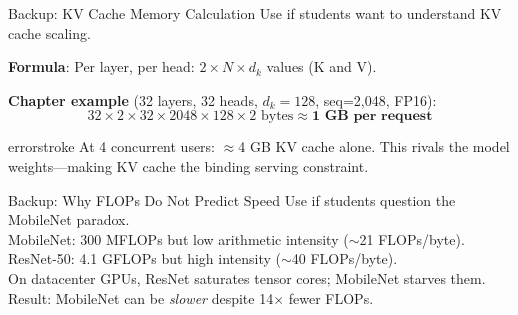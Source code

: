 \documentclass[aspectratio=169, 12pt]{beamer}
\begin{document}
\appendix

\begin{frame}{Backup: KV Cache Memory Calculation}
\small
Use if students want to understand KV cache scaling.

\vspace{0.2cm}
\textbf{Formula}: Per layer, per head: $2 \times N \times d_k$ values (K and V).

\vspace{0.1cm}
\textbf{Chapter example} (32 layers, 32 heads, $d_k=128$, seq=2,048, FP16):
$$32 \times 2 \times 32 \times 2048 \times 128 \times 2 \text{ bytes} \approx \textbf{1 GB per request}$$

\vspace{0.1cm}
\begin{mlsyscard}{errorstroke}
{\scriptsize At 4 concurrent users: $\approx$4 GB KV cache alone.
This rivals the model weights---making KV cache the binding serving constraint.}
\end{mlsyscard}
\end{frame}

\begin{frame}{Backup: Why FLOPs Do Not Predict Speed}
\small
Use if students question the MobileNet paradox.\\
MobileNet: 300 MFLOPs but low arithmetic intensity ($\sim$21 FLOPs/byte).\\
ResNet-50: 4.1 GFLOPs but high intensity ($\sim$40 FLOPs/byte).\\
On datacenter GPUs, ResNet saturates tensor cores; MobileNet starves them.\\
Result: MobileNet can be \emph{slower} despite 14$\times$ fewer FLOPs.
\end{frame}
\end{document}
